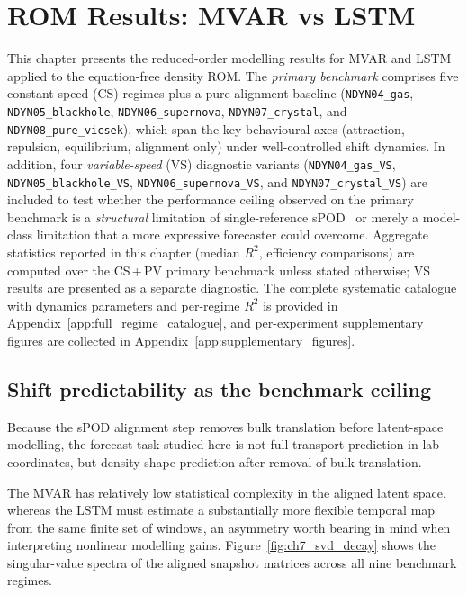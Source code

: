 \chapter{ROM Results: MVAR vs LSTM}
\label{ch:rom_results}

This chapter presents the reduced-order modelling results for MVAR and LSTM
applied to the equation-free density ROM\@.  The \emph{primary benchmark}
comprises five constant-speed (CS) regimes plus a pure alignment
baseline (\texttt{NDYN04\_gas}, \texttt{NDYN05\_blackhole},
\texttt{NDYN06\_supernova}, \texttt{NDYN07\_crystal}, and
\texttt{NDYN08\_pure\_vicsek}), which
span the key behavioural axes (attraction, repulsion, equilibrium,
alignment only)
under well-controlled shift dynamics.  In addition, four
\emph{variable-speed} (VS) diagnostic variants (\texttt{NDYN04\_gas\_VS},
\texttt{NDYN05\_blackhole\_VS}, \texttt{NDYN06\_supernova\_VS}, and
\texttt{NDYN07\_crystal\_VS}) are
included to test whether the performance ceiling observed on the primary
benchmark is a \emph{structural} limitation of single-reference sPOD~\cite{reiss2018shifted_pod} or
merely a model-class limitation that a more expressive forecaster could
overcome.  Aggregate statistics reported in this chapter (median $R^2$,
efficiency comparisons) are computed over the CS\,+\,PV primary benchmark
unless stated otherwise; VS results are presented as a separate diagnostic.
The complete systematic catalogue with dynamics parameters and
per-regime $R^2$ is provided in Appendix~\ref{app:full_regime_catalogue},
and per-experiment supplementary figures are collected in
Appendix~\ref{app:supplementary_figures}.

\section{Shift predictability as the benchmark ceiling}
\label{sec:ch7_shift_dynamics}

Because the sPOD alignment step removes bulk translation before latent-space
modelling, the forecast task studied here is not full transport
prediction in lab coordinates, but density-shape prediction after removal
of bulk translation.

The MVAR has relatively low statistical complexity in the
aligned latent space, whereas the LSTM must estimate a substantially more
flexible temporal map from the same finite set of windows, an asymmetry
worth bearing in mind when interpreting nonlinear modelling gains.
Figure~\ref{fig:ch7_svd_decay} shows the singular-value spectra of the
aligned snapshot matrices across all nine benchmark regimes.

